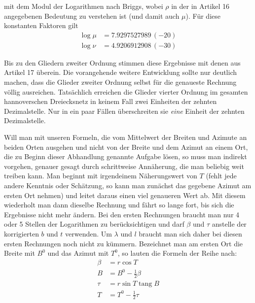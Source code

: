 %
mit dem Modul der Logarithmen nach Briggs, wobei \(\rho\) in der in Artikel 16 angegebenen Bedeutung zu verstehen ist (und damit auch \(\mu\)). Für diese konstanten Faktoren gilt
\[
\begin{aligned}
\log\mu&=7.9297527989\,(-20)\\
\log\nu&=4.9206912908\,(-30)
\end{aligned}
\]

\indent Bis zu den Gliedern zweiter Ordnung stimmen diese Ergebnisse mit denen aus Artikel 17 überein. Die vorangehende weitere Entwicklung sollte nur deutlich machen, dass die Glieder zweiter Ordnung selbst für die genaueste Rechnung völlig ausreichen. Tatsächlich erreichen die Glieder vierter Ordnung im gesamten hannoverschen Dreiecksnetz in keinem Fall zwei Einheiten der zehnten Dezimalstelle. Nur in ein paar Fällen überschreiten sie \textit{eine} Einheit der zehnten Dezimalstelle.

Will man mit unseren Formeln, die vom Mittelwert der Breiten und Azimute an beiden Orten ausgehen und nicht von der Breite und dem Azimut an einem Ort, die zu Beginn dieser Abhandlung genannte Aufgabe lösen, so muss man indirekt vorgehen, genauer gesagt durch schrittweise Annäherung, die man beliebig weit treiben kann. Man beginnt mit irgendeinem Näherungswert von \(T\) (fehlt jede andere Kenntnis oder Schätzung, so kann man zunächst das gegebene Azimut am ersten Ort nehmen) und leitet daraus einen viel genaueren Wert ab. Mit diesem wiederholt man dann dieselbe Rechnung und fährt so lange fort, bis sich die Ergebnisse nicht mehr ändern. Bei den ersten Rechnungen braucht man nur 4 oder 5 Stellen der Logarithmen zu berücksichtigen und darf \(\beta\) und \(\tau\) anstelle der korrigierten \(b\) und \(t\) verwenden. Um \(\lambda\) und \(l\) braucht man sich daher bei diesen ersten Rechnungen noch nicht zu kümmern. Bezeichnet man am ersten Ort die Breite mit \(B^0\) und das Azimut mit \(T^0\), so lauten die Formeln der Reihe nach:
\[
\begin{aligned}
\beta&=r\cos T\\
B&=B^0-\tfrac12\beta\\
\tau&=r\sin T\operatorname{tang}B\\
T&=T^0-\tfrac12\tau
\end{aligned}
\]
